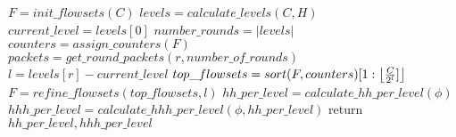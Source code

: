 \begin{algorithm}\small
    $F = init\_flowsets(C)$\;
    $levels=calculate\_levels(C,H)$\;
    $current\_level=levels[0]$\;
    $number\_rounds=|levels|$\;
    {
        $counters=assign\_counters(F)$\;
        $packets=get\_round\_packets(r, number\_of\_rounds)$\;
        {
            $l=levels[r]-current\_level$\;
            $top\_flowsets=sort(F, counters)[1:\left\lfloor \frac{C}{2^l}] \right\rfloor$\;
            $F=refine\_flowsets(top\_flowsets,l)$\;
        }
    }
    $hh\_per\_level=calculate\_hh\_per\_level(\phi)$\;
    $hhh\_per\_level=calculate\_hhh\_per\_level(\phi, hh\_per\_level)$\;
    return $hh\_per\_level, hhh\_per\_level$
    \SetAlgoRefName{\multipleAlgo}
    \caption{}
    \label{algo:multiple_split}
\end{algorithm}